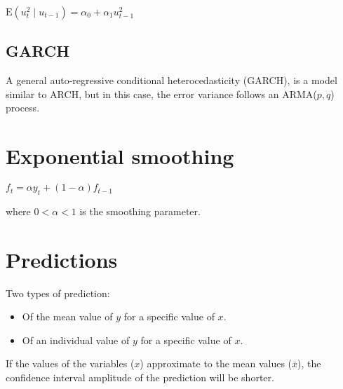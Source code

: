 \documentclass[10pt, a4paper, landscape]{extarticle}
\newcommand{\E}{\mathrm{E}}
\begin{document}
\begin{multicols}{3}
\begin{center}
	$\E(u^2_t \mid u_{t - 1}) = \alpha_0 + \alpha_1 u^2_{t - 1}$
\end{center}

\subsection*{GARCH}

A general auto-regressive conditional heterocedasticity (GARCH), is a model similar to ARCH, but in this case, the error variance follows an ARMA($p, q$) process.

\section*{Exponential smoothing}

\begin{center}
	$f_t = \alpha y_t + (1 - \alpha) f_{t - 1}$
\end{center}

where $0 < \alpha < 1$ is the smoothing parameter.

\section*{Predictions}

Two types of prediction:

\begin{itemize}[leftmargin=*]
	\item Of the mean value of $y$ for a specific value of $x$.
	\item Of an individual value of $y$ for a specific value of $x$.
\end{itemize}

If the values of the variables ($x$) approximate to the mean values ($\overline{x}$), the confidence interval amplitude of the prediction will be shorter.

\end{multicols}
\end{document}
